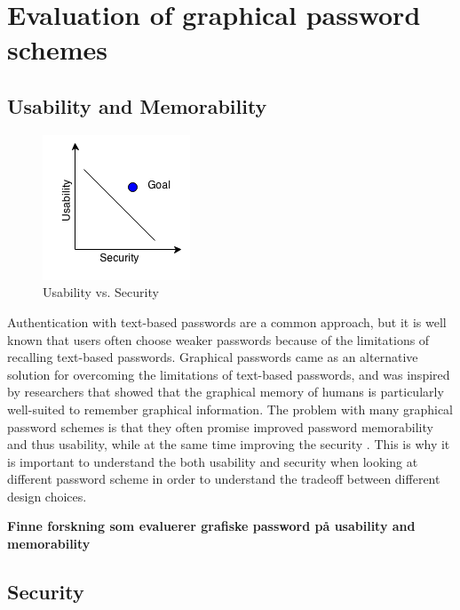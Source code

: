 \section{Evaluation of graphical password schemes}

\subsection{Usability and Memorability}

  \begin{figure}
    \vspace{-20pt}
    \begin{center}
      \includegraphics[scale=0.7]{pics/UsabilityVsSecurity.png}
    \end{center}
    \vspace{-20pt}
    \caption{Usability vs. Security}
    \vspace{-10pt}
  \end{figure}

  Authentication with text-based passwords are a common approach, but it is well known that users often choose weaker passwords because of the limitations of recalling text-based passwords. Graphical passwords came as an alternative solution for overcoming the limitations of text-based passwords, and was inspired by researchers that showed that the graphical memory of humans is particularly well-suited to remember graphical information. The problem with many graphical password schemes is that they often promise improved password memorability and thus usability, while at the same time improving the security \cite{Biddle}. This is why it is important to understand the both usability and security when looking at different password scheme in order to understand the tradeoff between different design choices. 

  {\color{red} \bf Finne forskning som evaluerer grafiske password på usability and memorability}
    
\subsection{Security}

